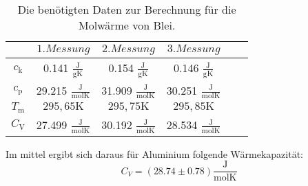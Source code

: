 \begin{table}[H]
	\centering
	\caption{Die benötigten Daten zur Berechnung für die Molwärme von Blei.}
	\label{tab:at_pb}
	\begin{tabular}{c c c c c c}
	\toprule
	$ $ & $1.Messung$ & $2. Messung$ & $3. Messung$ \\
	\midrule
	$c_{\text{k}}$ & 0.141 $\frac{\text{J}}{\text{gK}}$ & 0.154 $\frac{\text{J}}{\text{gK}}$ & 0.146 $\frac{\text{J}}{\text{gK}}$ \\
	$c_{\text{p}}$ & 29.215 $\frac{\si{\joule}}{\si{\mol \kelvin}}$ & 31.909 $\frac{\si{\joule}}{\si{\mol \kelvin}}$ & 30.251 $\frac{\si{\joule}}{\si{\mol \kelvin}}$ \\
	$T_{\text{m}}$ & $295,65 \si{\kelvin}$ & $295,75 \si{\kelvin}$ & $295,85 \si{\kelvin}$ \\
	\midrule
	$C_{\text{V}}$ & 27.499 $\frac{\si{\joule}}{\si{\mol \kelvin}}$ &  30.192 $\frac{\si{\joule}}{\si{\mol \kelvin}}$ &  28.534 $\frac{\si{\joule}}{\si{\mol \kelvin}}$ \\
	\bottomrule
	\end{tabular}
\end{table}
Im mittel ergibt sich daraus für Aluminium folgende Wärmekapazität:
\begin{equation*}
	C_V=(28.74 \pm 0.78)\frac{\si{\joule}}{\si{\mol \kelvin}}
\end{equation*}
